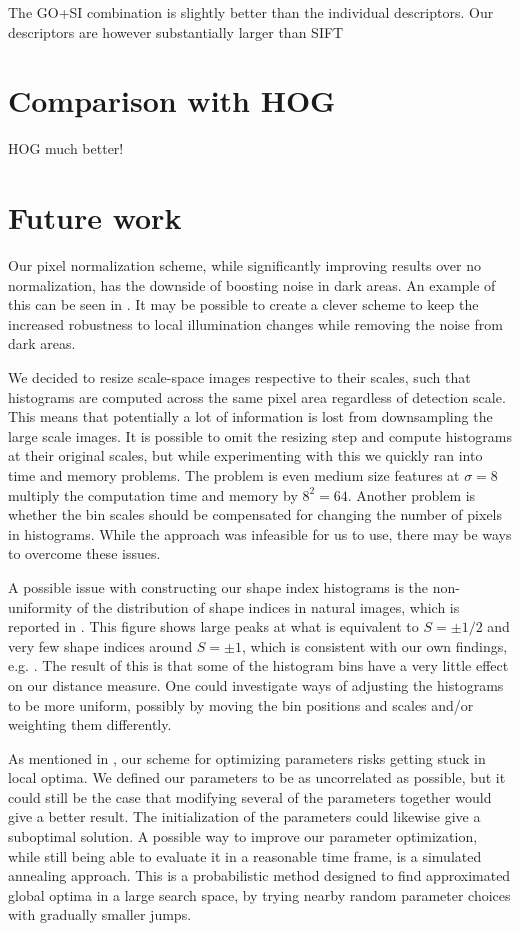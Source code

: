 \documentclass[thesis.tex]{subfiles}
\begin{document}
 The GO+SI combination is slightly better than the individual descriptors. Our descriptors are however substantially larger than SIFT

\section{Comparison with HOG}
HOG much better!

\section{Future work} %
%
Our pixel normalization scheme, while significantly improving results over no normalization, has the downside of boosting noise in dark areas. An example of this can be seen in . It may be possible to create a clever scheme to keep the increased robustness to local illumination changes while removing the noise from dark areas.

We decided to resize scale-space images respective to their scales, such that histograms are computed across the same pixel area regardless of detection scale. This means that potentially a lot of information is lost from downsampling the large scale images. It is possible to omit the resizing step and compute histograms at their original scales, but while experimenting with this we quickly ran into time and memory problems. The problem is even medium size features at $\sigma = 8$ multiply the computation time and memory by $8^2 = 64$. Another problem is whether the bin scales should be compensated for changing the number of pixels in histograms. While the approach was infeasible for us to use, there may be ways to overcome these issues.

A possible issue with constructing our shape index histograms is the non-uniformity of the distribution of shape indices in natural images, which is reported in \citep[Fig. 3]{lillholm2009statistics}. This figure shows large peaks at what is equivalent to $S = \pm 1/2$ and very few shape indices around $S = \pm 1$, which is consistent with our own findings, e.g. . The result of this is that some of the histogram bins have a very little effect on our distance measure. One could investigate ways of adjusting the histograms to be more uniform, possibly by moving the bin positions and scales and/or weighting them differently.

As mentioned in , our scheme for optimizing parameters risks getting stuck in local optima. We defined our parameters to be as uncorrelated as possible, but it could still be the case that modifying several of the parameters together would give a better result. The initialization of the parameters could likewise give a suboptimal solution. A possible way to improve our parameter optimization, while still being able to evaluate it in a reasonable time frame, is a simulated annealing approach. This is a probabilistic method designed to find approximated global optima in a large search space, by trying nearby random parameter choices with gradually smaller jumps. 
\end{document}
